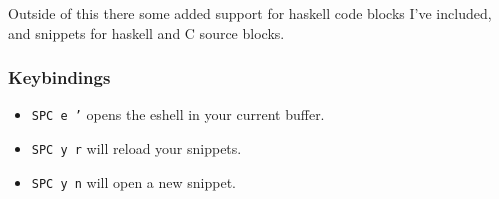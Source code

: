 \documentclass[11pt]{article}
\begin{document}
Outside of this there some added support for haskell code blocks I've included, and snippets for haskell and C
source blocks.
\subsubsection{Keybindings}
\label{sec:org70e4cf7}
\begin{itemize}
\item \texttt{SPC e '} opens the eshell in your current buffer.
\item \texttt{SPC y r} will reload your snippets.
\item \texttt{SPC y n} will open a new snippet.
\end{itemize}
\end{document}
